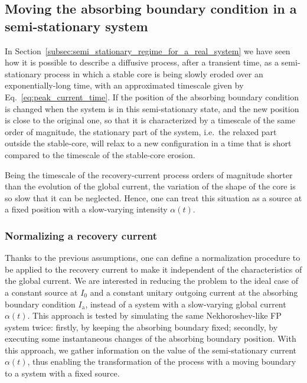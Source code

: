 
\subsection{Moving the absorbing boundary condition in a semi-stationary system}
\label{subsec:Moving_the_boundary_in_a_semi_stationary_system}


In Section~\ref{subsec:semi_stationary_regime_for_a_real_system} we have seen how it is possible to describe a diffusive process, after a transient time, as a semi-stationary process in which a stable core is being slowly eroded over an exponentially-long time, with an approximated timescale given by Eq.~\eqref{eq:peak_current_time}. If the position of the absorbing boundary condition is changed when the system is in this semi-stationary state, and the new position is close to the original one, so that it is characterized by a timescale of the same order of magnitude, the stationary part of the system, i.e.\ the relaxed part outside the stable-core, will relax to a new configuration in a time that is short compared to the timescale of the stable-core erosion.

Being the timescale of the recovery-current process orders of magnitude shorter than the evolution of the global current, the variation of the shape of the core is so slow that it can be neglected. Hence, one can treat this situation as a source at a fixed position with a slow-varying intensity $\alpha(t)$. 


\subsubsection{Normalizing a recovery current}


Thanks to the previous assumptions, one can define a normalization procedure to be applied to the recovery current to make it independent of the characteristics of the global current. We are interested in reducing the problem to the ideal case of a constant source at $I_0$ and a constant unitary outgoing current at the absorbing boundary condition $I_\mathrm{a}$, instead of a system with a slow-varying global current $\alpha(t)$. This approach is tested by simulating the same Nekhoroshev-like FP system twice: firstly, by keeping the absorbing boundary fixed; secondly, by executing some instantaneous changes of the absorbing boundary position. With this approach, we gather information on the value of the semi-stationary current $\alpha(t)$, thus enabling the transformation of the process with a moving boundary to a system with a fixed source.

